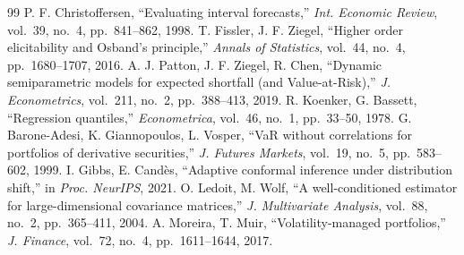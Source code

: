 \documentclass[conference,a4paper]{IEEEtran}
\begin{document}
\begin{thebibliography}{99}
 P. F. Christoffersen, ``Evaluating interval forecasts,'' \emph{Int. Economic Review}, vol.~39, no.~4, pp.~841--862, 1998.
 T. Fissler, J. F. Ziegel, ``Higher order elicitability and Osband's principle,'' \emph{Annals of Statistics}, vol.~44, no.~4, pp.~1680--1707, 2016.
 A. J. Patton, J. F. Ziegel, R. Chen, ``Dynamic semiparametric models for expected shortfall (and Value-at-Risk),'' \emph{J. Econometrics}, vol.~211, no.~2, pp.~388--413, 2019.
 R. Koenker, G. Bassett, ``Regression quantiles,'' \emph{Econometrica}, vol.~46, no.~1, pp.~33--50, 1978.
 G. Barone-Adesi, K. Giannopoulos, L. Vosper, ``VaR without correlations for portfolios of derivative securities,'' \emph{J. Futures Markets}, vol.~19, no.~5, pp.~583--602, 1999.
 I. Gibbs, E. Cand\`es, ``Adaptive conformal inference under distribution shift,'' in \emph{Proc. NeurIPS}, 2021.
 O. Ledoit, M. Wolf, ``A well-conditioned estimator for large-dimensional covariance matrices,'' \emph{J. Multivariate Analysis}, vol.~88, no.~2, pp.~365--411, 2004.
 A. Moreira, T. Muir, ``Volatility-managed portfolios,'' \emph{J. Finance}, vol.~72, no.~4, pp.~1611--1644, 2017.
\end{thebibliography}
\end{document}
